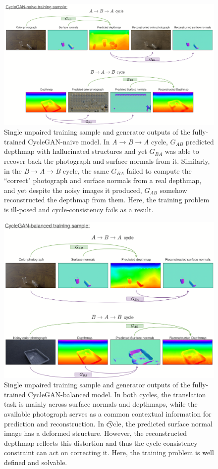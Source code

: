 \begin{figure}[h!]
    \centering
    \includegraphics[width=\linewidth]{figures/Expt_1/cyclegan_naive_cycles.png}
    \caption{Single unpaired training sample and generator outputs of the fully-trained CycleGAN-naive model. In \textit{A}$\rightarrow$\textit{B}$\rightarrow$\textit{A} cycle, $G_{AB}$ predicted depthmap with hallucinated structures and yet $G_{BA}$ was able to recover back the photograph and surface normals from it. Similarly, in the \textit{B}$\rightarrow$\textit{A}$\rightarrow$\textit{B} cycle, the same $G_{BA}$ failed to compute the ``correct" photograph and surface normals from a real depthmap, and yet despite the noisy images it produced, $G_{AB}$ somehow reconstructed the depthmap from them. Here, the training problem is ill-posed and cycle-consistency fails as a result.}
    \label{fig:cleargrasp_cyclegan_naive_cycles}
\end{figure}

\begin{figure}[h!]
    \centering
    \includegraphics[width=0.8\linewidth]{figures/Expt_1/cyclegan_balanced_cycles.png}
    \caption{Single unpaired training sample and generator outputs of the fully-trained CycleGAN-balanced model. In both cycles, the translation task is mainly across surface normals and depthmaps, while the available photograph serves as a common contextual information for prediction and reconstruction. In \t cycle, the predicted surface normal image has a deformed structure. However, the reconstructed depthmap reflects this distortion and thus the cycle-consistency constraint can act on correcting it. Here, the training problem is well defined and solvable.}
    \label{fig:cleargrasp_cyclegan_balanced_cycles}
\end{figure}

